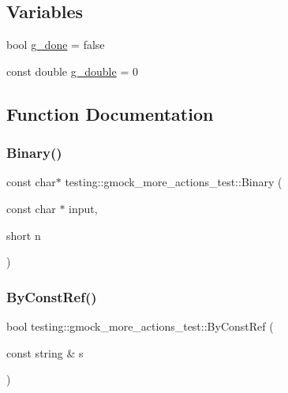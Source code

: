 \subsection*{Variables}
\begin{DoxyCompactItemize}
\item 
bool \hyperlink{namespacetesting_1_1gmock__more__actions__test_ab2d168581c62c89bd00cdadcccd9e8e4}{g\+\_\+done} = false
\item 
const double \hyperlink{namespacetesting_1_1gmock__more__actions__test_a73552112032ff5d5900dd6f128a62718}{g\+\_\+double} = 0
\end{DoxyCompactItemize}


\subsection{Function Documentation}
\mbox{\label{namespacetesting_1_1gmock__more__actions__test_a853c9f048674a60798b930750b74a1df}} 
\subsubsection{\texorpdfstring{Binary()}{Binary()}}
{\footnotesize\ttfamily const char$\ast$ testing\+::gmock\+\_\+more\+\_\+actions\+\_\+test\+::\+Binary (\begin{DoxyParamCaption}\item[{const char $\ast$}]{input,  }\item[{short}]{n }\end{DoxyParamCaption})}

\mbox{\label{namespacetesting_1_1gmock__more__actions__test_ab175725bcdacf7a00948c7d5c1a36419}} 
\subsubsection{\texorpdfstring{By\+Const\+Ref()}{ByConstRef()}}
{\footnotesize\ttfamily bool testing\+::gmock\+\_\+more\+\_\+actions\+\_\+test\+::\+By\+Const\+Ref (\begin{DoxyParamCaption}\item[{const string \&}]{s }\end{DoxyParamCaption})}

